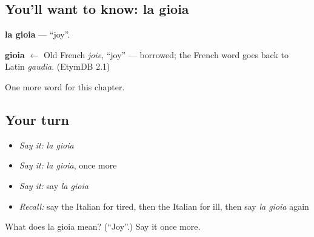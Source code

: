 \subsection*{You'll want to know: la gioia}
\textbf{la gioia} — \textquotedblleft{}joy\textquotedblright{}.

\begin{cousinweb}
\textbf{gioia} $\leftarrow$ Old French \emph{joie}, \textquotedblleft{}joy\textquotedblright{} — borrowed; the French word goes back to Latin \emph{gaudia}. (EtymDB 2.1)
\end{cousinweb}

\begin{grammarlens}[title={What you've built}]
One more word for this chapter.
\end{grammarlens}

\subsection*{Your turn}
\begin{itemize}
\raggedright
  \item \emph{Say it:} \emph{la gioia}
  \item \emph{Say it:} \emph{la gioia}, once more
  \item \emph{Say it:} say \emph{la gioia}
  \item \emph{Recall:} say the Italian for tired, then the Italian for ill, then say \emph{la gioia} again
\end{itemize}

\begin{tcolorbox}[breakable,colback=teal!4,colframe=teal!35!black,title={Before you move on}]
What does la gioia mean? (\textquotedblleft{}Joy\textquotedblright{}.) Say it once more.
\end{tcolorbox}
